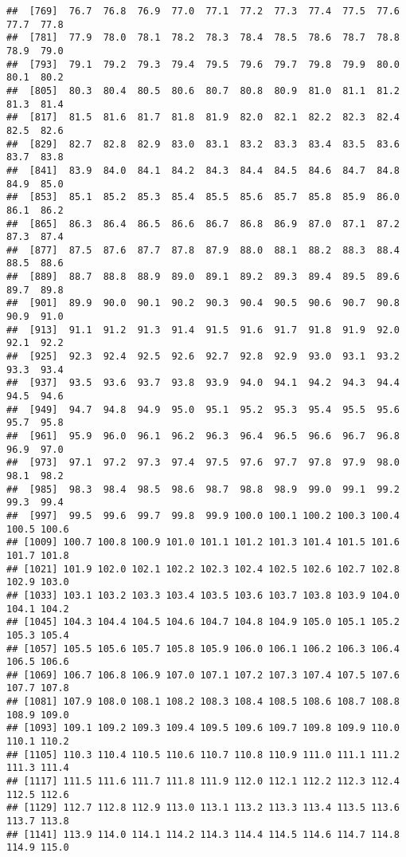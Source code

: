 \documentclass[
]{article}
\begin{document}
\begin{verbatim}
##  [769]  76.7  76.8  76.9  77.0  77.1  77.2  77.3  77.4  77.5  77.6  77.7  77.8
##  [781]  77.9  78.0  78.1  78.2  78.3  78.4  78.5  78.6  78.7  78.8  78.9  79.0
##  [793]  79.1  79.2  79.3  79.4  79.5  79.6  79.7  79.8  79.9  80.0  80.1  80.2
##  [805]  80.3  80.4  80.5  80.6  80.7  80.8  80.9  81.0  81.1  81.2  81.3  81.4
##  [817]  81.5  81.6  81.7  81.8  81.9  82.0  82.1  82.2  82.3  82.4  82.5  82.6
##  [829]  82.7  82.8  82.9  83.0  83.1  83.2  83.3  83.4  83.5  83.6  83.7  83.8
##  [841]  83.9  84.0  84.1  84.2  84.3  84.4  84.5  84.6  84.7  84.8  84.9  85.0
##  [853]  85.1  85.2  85.3  85.4  85.5  85.6  85.7  85.8  85.9  86.0  86.1  86.2
##  [865]  86.3  86.4  86.5  86.6  86.7  86.8  86.9  87.0  87.1  87.2  87.3  87.4
##  [877]  87.5  87.6  87.7  87.8  87.9  88.0  88.1  88.2  88.3  88.4  88.5  88.6
##  [889]  88.7  88.8  88.9  89.0  89.1  89.2  89.3  89.4  89.5  89.6  89.7  89.8
##  [901]  89.9  90.0  90.1  90.2  90.3  90.4  90.5  90.6  90.7  90.8  90.9  91.0
##  [913]  91.1  91.2  91.3  91.4  91.5  91.6  91.7  91.8  91.9  92.0  92.1  92.2
##  [925]  92.3  92.4  92.5  92.6  92.7  92.8  92.9  93.0  93.1  93.2  93.3  93.4
##  [937]  93.5  93.6  93.7  93.8  93.9  94.0  94.1  94.2  94.3  94.4  94.5  94.6
##  [949]  94.7  94.8  94.9  95.0  95.1  95.2  95.3  95.4  95.5  95.6  95.7  95.8
##  [961]  95.9  96.0  96.1  96.2  96.3  96.4  96.5  96.6  96.7  96.8  96.9  97.0
##  [973]  97.1  97.2  97.3  97.4  97.5  97.6  97.7  97.8  97.9  98.0  98.1  98.2
##  [985]  98.3  98.4  98.5  98.6  98.7  98.8  98.9  99.0  99.1  99.2  99.3  99.4
##  [997]  99.5  99.6  99.7  99.8  99.9 100.0 100.1 100.2 100.3 100.4 100.5 100.6
## [1009] 100.7 100.8 100.9 101.0 101.1 101.2 101.3 101.4 101.5 101.6 101.7 101.8
## [1021] 101.9 102.0 102.1 102.2 102.3 102.4 102.5 102.6 102.7 102.8 102.9 103.0
## [1033] 103.1 103.2 103.3 103.4 103.5 103.6 103.7 103.8 103.9 104.0 104.1 104.2
## [1045] 104.3 104.4 104.5 104.6 104.7 104.8 104.9 105.0 105.1 105.2 105.3 105.4
## [1057] 105.5 105.6 105.7 105.8 105.9 106.0 106.1 106.2 106.3 106.4 106.5 106.6
## [1069] 106.7 106.8 106.9 107.0 107.1 107.2 107.3 107.4 107.5 107.6 107.7 107.8
## [1081] 107.9 108.0 108.1 108.2 108.3 108.4 108.5 108.6 108.7 108.8 108.9 109.0
## [1093] 109.1 109.2 109.3 109.4 109.5 109.6 109.7 109.8 109.9 110.0 110.1 110.2
## [1105] 110.3 110.4 110.5 110.6 110.7 110.8 110.9 111.0 111.1 111.2 111.3 111.4
## [1117] 111.5 111.6 111.7 111.8 111.9 112.0 112.1 112.2 112.3 112.4 112.5 112.6
## [1129] 112.7 112.8 112.9 113.0 113.1 113.2 113.3 113.4 113.5 113.6 113.7 113.8
## [1141] 113.9 114.0 114.1 114.2 114.3 114.4 114.5 114.6 114.7 114.8 114.9 115.0

\end{verbatim}
\end{document}

